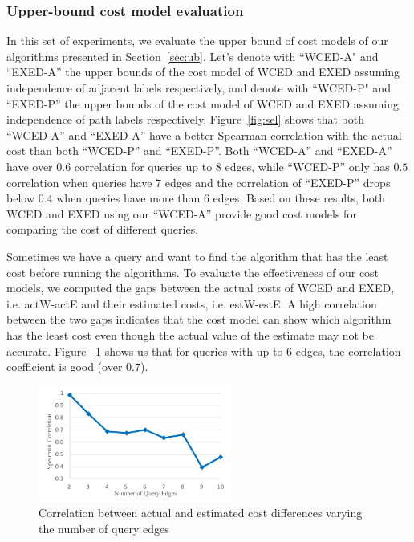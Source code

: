\documentclass{sigmod}
\begin{document}
\subsubsection{Upper-bound cost model evaluation}
In this set of experiments, we evaluate the upper bound of cost models of our algorithms presented in Section~\ref{sec:ub}. Let's denote with ``WCED-A" and ``EXED-A'' the upper bounds of the cost model of WCED and EXED assuming independence of adjacent labels respectively, and denote with ``WCED-P" and ``EXED-P'' the upper bounds of the cost model of WCED and EXED assuming independence of path labels respectively. Figure~\ref{fig:sel} shows that both ``WCED-A'' and ``EXED-A'' have a better Spearman correlation with the actual cost than both ``WCED-P'' and ``EXED-P''. Both ``WCED-A'' and ``EXED-A'' have over $0.6$ correlation for queries up to $8$ edges, while ``WCED-P''  only has $0.5$ correlation when queries have $7$ edges and the correlation of ``EXED-P''  drops below $0.4$ when queries have more than $6$ edges. Based on these results, both WCED and EXED using our ``WCED-A'' provide good cost models for comparing the cost of different queries.

Sometimes we have a query and want to find the algorithm that has the least cost before running the algorithms. To evaluate the effectiveness of our cost models, we computed the gaps between the actual costs of WCED and EXED, i.e. actW-actE and their estimated costs, i.e. estW-estE. A high correlation between the two gaps indicates that the cost model can show which algorithm has the least cost even though the actual value of the estimate may not be accurate. Figure ~\ref{fig:costcomp} shows us that for queries with up to $6$ edges, the correlation coefficient is good (over $0.7$). 


\begin{figure}[htbp] 
\setlength{\abovecaptionskip}{-0.5\baselineskip}
\setlength{\belowcaptionskip}{-0.5\baselineskip}
\centering\includegraphics[width=2.5in]{algcostcomp.pdf} 
\caption{Correlation between actual and estimated cost differences varying the number of query edges}
\label{fig:costcomp}
\end{figure}
\end{document}
